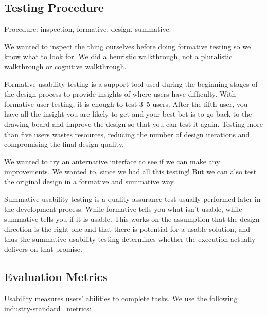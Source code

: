 \documentclass[USenglish,oneside,twocolumn]{article}
\begin{document}
\subsection{Testing Procedure} 
{\color {blue}

Procedure: inspection, formative, design, summative. 

We wanted to inspect the thing ourselves before doing formative testing so we know what to look for. 
We did a heuristic walkthrough, not a pluralistic walkthrough or cognitive walkthrough. 

Formative usability testing is a support tool used during the beginning stages of the design process to provide insights of where users have difficulty. With formative user testing, it is enough to test 3–5 users. After the fifth user, you have all the insight you are likely to get and your best bet is to go back to the drawing board and improve the design so that you can test it again. Testing more than five users wastes resources, reducing the number of design iterations and compromising the final design quality.


We wanted to try an anternative interface to see if we can make any improvements. We wanted to, since we had all this testing! But we can also test the original design in a formative and summative way. 

Summative usability testing is a quality assurance test usually performed later in the development process. While formative tells you what isn't usable, while summative tells you if it is usable. This works on the assumption that the design direction is the right one and that there is potential for a usable solution, and thus the summative usability testing determines whether the execution actually delivers on that promise.
}

\subsection{Evaluation Metrics}
\label{sec:eval}
Usability measures users' abilities to complete tasks. We use the following industry-standard~\cite{albert2013measuring} metrics: \\
\end{document}
